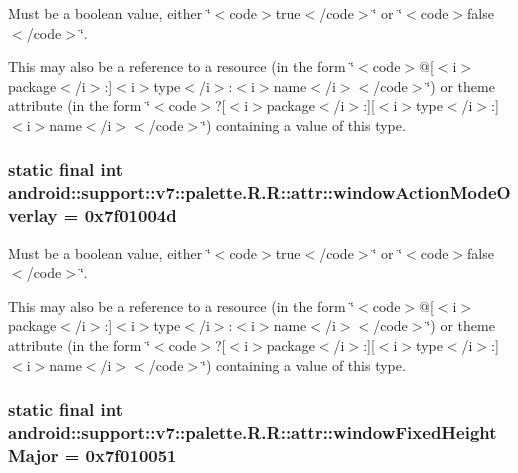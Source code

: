 Must be a boolean value, either \char`\"{}$<$code$>$true$<$/code$>$\char`\"{} or \char`\"{}$<$code$>$false$<$/code$>$\char`\"{}. 

This may also be a reference to a resource (in the form \char`\"{}$<$code$>$@\mbox{[}$<$i$>$package$<$/i$>$:\mbox{]}$<$i$>$type$<$/i$>$:$<$i$>$name$<$/i$>$$<$/code$>$\char`\"{}) or theme attribute (in the form \char`\"{}$<$code$>$?\mbox{[}$<$i$>$package$<$/i$>$:\mbox{]}\mbox{[}$<$i$>$type$<$/i$>$:\mbox{]}$<$i$>$name$<$/i$>$$<$/code$>$\char`\"{}) containing a value of this type. \hypertarget{classandroid_1_1support_1_1v7_1_1palette_1_1_r_1_1attr_16736333a8e367a30d23a79f350ba1c2}{
\subsubsection[{windowActionModeOverlay}]{\setlength{\rightskip}{0pt plus 5cm}static final int android::support::v7::palette.R.R::attr::windowActionModeOverlay = 0x7f01004d}}
\label{classandroid_1_1support_1_1v7_1_1palette_1_1_r_1_1attr_16736333a8e367a30d23a79f350ba1c2}


Must be a boolean value, either \char`\"{}$<$code$>$true$<$/code$>$\char`\"{} or \char`\"{}$<$code$>$false$<$/code$>$\char`\"{}. 

This may also be a reference to a resource (in the form \char`\"{}$<$code$>$@\mbox{[}$<$i$>$package$<$/i$>$:\mbox{]}$<$i$>$type$<$/i$>$:$<$i$>$name$<$/i$>$$<$/code$>$\char`\"{}) or theme attribute (in the form \char`\"{}$<$code$>$?\mbox{[}$<$i$>$package$<$/i$>$:\mbox{]}\mbox{[}$<$i$>$type$<$/i$>$:\mbox{]}$<$i$>$name$<$/i$>$$<$/code$>$\char`\"{}) containing a value of this type. \hypertarget{classandroid_1_1support_1_1v7_1_1palette_1_1_r_1_1attr_7092daf55c8b157004cd3ea2e4e3ae1f}{
\subsubsection[{windowFixedHeightMajor}]{\setlength{\rightskip}{0pt plus 5cm}static final int android::support::v7::palette.R.R::attr::windowFixedHeightMajor = 0x7f010051}}
\label{classandroid_1_1support_1_1v7_1_1palette_1_1_r_1_1attr_7092daf55c8b157004cd3ea2e4e3ae1f}


